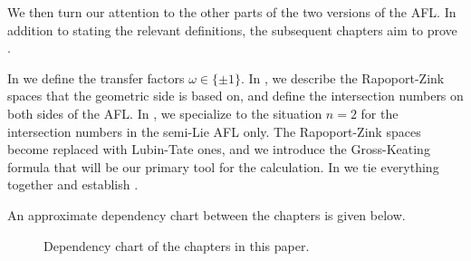 \begin{itemize}
  \ii We then turn our attention to the other parts of the two versions of the AFL.
  In addition to stating the relevant definitions,
  the subsequent chapters aim to prove .
  \begin{itemize}
    \ii In  we define the transfer factors $\omega \in \{\pm1\}$.
    \ii In , we describe the Rapoport-Zink spaces
    that the geometric side is based on, and define the intersection numbers
    on both sides of the AFL.
    \ii In , we specialize to the situation $n = 2$
    for the intersection numbers in the semi-Lie AFL only.
    The Rapoport-Zink spaces become replaced with Lubin-Tate ones,
    and we introduce the Gross-Keating formula
    that will be our primary tool for the calculation.
    \ii In  we tie everything together and establish
    .
  \end{itemize}
\end{itemize}

An approximate dependency chart between the chapters is given below.
\begin{figure}[ht]
  \begin{center}
  \end{center}
  \caption{Dependency chart of the chapters in this paper.}
  \label{fig:depchart}
\end{figure}
